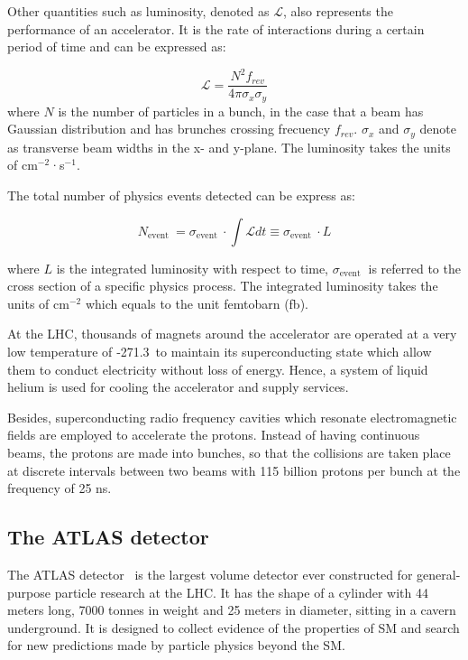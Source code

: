 \documentclass[UTF8,12pt]{ctexart}
\numberwithin{equation}{section}
\begin{document}
Other quantities such as luminosity, denoted as $\mathcal{L}$, also represents the performance of an accelerator. It is the rate of interactions during a certain period of time and can be expressed as:

\begin{equation}
\mathcal{L}=\frac{N^2 f_{r e v}}{4 \pi \sigma_x \sigma_y} 
\end{equation}
where $N$ is the number of particles in a bunch, in the case that a beam has Gaussian distribution and has brunches crossing frecuency $f_{rev}$. $\sigma_x$ and $\sigma_y$ denote as transverse beam widths in the x- and y-plane. The luminosity takes the units of cm$^{-2}$·s$^{-1}$.

The total number of physics events detected can be express as:

\begin{equation}
N_{\text {event }}=\sigma_{\text {event }} \cdot \int \mathcal{L} d t \equiv \sigma_{\text {event }} \cdot L
\end{equation}

where $L$ is the integrated luminosity with respect to time, $\sigma_{\text {event }}$ is referred to the cross section of a specific physics process. The integrated luminosity takes the units of cm$^{-2}$ which equals to the unit femtobarn (fb).

 At the LHC, thousands of magnets around the accelerator are operated at a very low temperature of ‑271.3\textcelsius \ to maintain its superconducting state which allow them to conduct electricity without loss of energy. Hence, a system of liquid helium is used for cooling the accelerator and supply services.

Besides, superconducting radio frequency cavities which resonate electromagnetic fields are employed to accelerate the protons. Instead of having continuous beams, the protons are made into bunches, so that the collisions are taken place at discrete intervals between two beams with 115 billion protons per bunch at the frequency of 25 ns.


\subsection{The ATLAS detector}
\label{sec:3.2}

The ATLAS detector~\cite{PERF-2007-01} is the largest volume detector ever constructed for general-purpose particle research at the LHC. It has the shape of a cylinder with 44 meters long, 7000 tonnes in weight and 25 meters in diameter, sitting in a cavern underground. It is designed to collect evidence of the properties of SM and search for new predictions made by particle physics beyond the SM.
\end{document}
